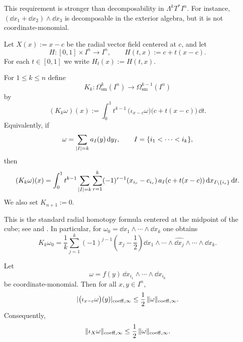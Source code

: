 \begin{remark}
This requirement is stronger than decomposability in
$\Lambda^kT^\ast I^n$. For instance,
$(\dd x_1+\dd x_2)\wedge \dd x_3$ is decomposable in the exterior algebra, but
it is not coordinate-monomial.
\end{remark}

Let $X(x):=x-c$ be the radial vector field centered at $c$, and let
\[
H:[0,1]\times I^n\to I^n,
\qquad
H(t,x):=c+t(x-c).
\]
For each $t\in[0,1]$ we write $H_t(x):=H(t,x)$.

\begin{definition}
\label{def:homotopy-operator}
For $1\le k\le n$ define
\[
K_k:\Omega^k_{\mathrm{sm}}(I^n)\longrightarrow
\Omega^{k-1}_{\mathrm{sm}}(I^n)
\]
by
\begin{equation}
\label{eq:K-definition}
(K_k\omega)(x):=
\int_0^1 t^{k-1}\,
\bigl(\iota_{x-c}\omega\bigr)\bigl(c+t(x-c)\bigr)\,\dd t .
\end{equation}
Equivalently, if
\[
\omega=\sum_{\lvert I \rvert=k}a_I(y)\,\mathrm{d} y_I,
\qquad I=\{i_1<\cdots<i_k\},
\]
then
\begin{equation}
\label{eq:K-coefficient-formula}
(K_k\omega)(x)=
\int_0^1 t^{k-1}
\sum_{\lvert I \rvert=k}\sum_{r=1}^k
(-1)^{r-1}(x_{i_r}-c_{i_r})\,
a_I(c+t(x-c))\,\mathrm{d} x_{I\setminus\{i_r\}}\,\mathrm{d} t .
\end{equation}
We also set $K_{n+1}:=0$.
\end{definition}

This is the standard radial homotopy formula centered at the midpoint of the
cube; see \cite[Sec.~3]{BottTu1982} and
\cite{Dupont1976,DupontBook1978,Albert2020}. In particular, for
$\omega_0=\dd x_1\wedge\cdots\wedge \dd x_k$ one obtains
\begin{equation}
\label{eq:explicit-minimizer}
K_k\omega_0
=
\frac{1}{k}\sum_{j=1}^k (-1)^{j-1}\left(x_j-\frac12\right)
\dd x_1\wedge\cdots\wedge\widehat{\dd x_j}\wedge\cdots\wedge \dd x_k.
\end{equation}

\begin{lemma}
\label{lem:contraction-estimate}
Let
\[
\omega=f(y)\,\dd x_{i_1}\wedge\cdots\wedge\dd x_{i_k}
\]
be coordinate-monomial. Then for all $x,y\in I^n$,
\[
\lvert \bigl(\iota_{x-c}\omega\bigr)(y) \rvert_{\mathrm{coeff},\infty}
\le \frac12\,\lVert \omega \rVert_{\mathrm{coeff},\infty}.
\]
Consequently,
\[
\lVert \iota_X\omega \rVert_{\mathrm{coeff},\infty}
\le \frac12\,\lVert \omega \rVert_{\mathrm{coeff},\infty}.
\]
\end{lemma}

